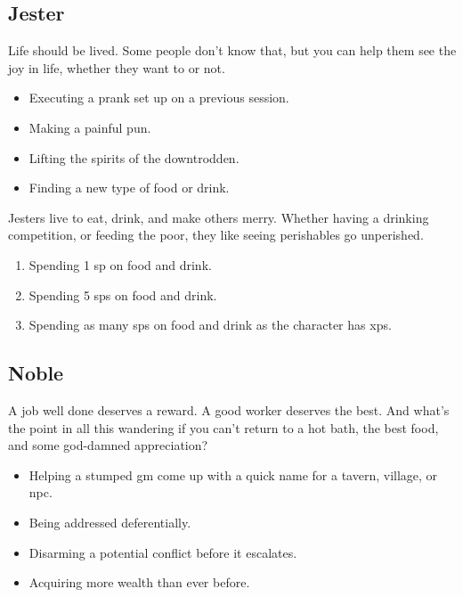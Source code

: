 \begin{multicols}{2}
\subsection{Jester}

Life should be lived.
Some people don't know that, but you can help them see the joy in life, whether they want to or not.

\begin{itemize}
  \item
  Executing a prank set up on a previous session.
  \item
  Making a painful pun.
  \item
  Lifting the spirits of the downtrodden.
  \item
  Finding a new type of food or drink.
\end{itemize}

Jesters live to eat, drink, and make others merry.
Whether having a drinking competition, or feeding the poor, they like seeing perishables go unperished.

\begin{enumerate}
  \item
  Spending 1 \gls{sp} on food and drink.
  \item
  Spending 5 \glspl{sp} on food and drink.
  \item
  Spending as many \glspl{sp} on food and drink as the character has \glspl{xp}.
\end{enumerate}

\subsection{Noble}

A job well done deserves a reward.
A good worker deserves the best.
And what's the point in all this wandering if you can't return to a hot bath, the best food, and some god-damned appreciation?

\begin{itemize}

  \item
  Helping a stumped \gls{gm} come up with a quick name for a tavern, village, or \gls{npc}.
  \item
  Being addressed deferentially.
  \item
  Disarming a potential conflict before it escalates.
  \item
  Acquiring more wealth than ever before.

\end{itemize}


\end{multicols}
